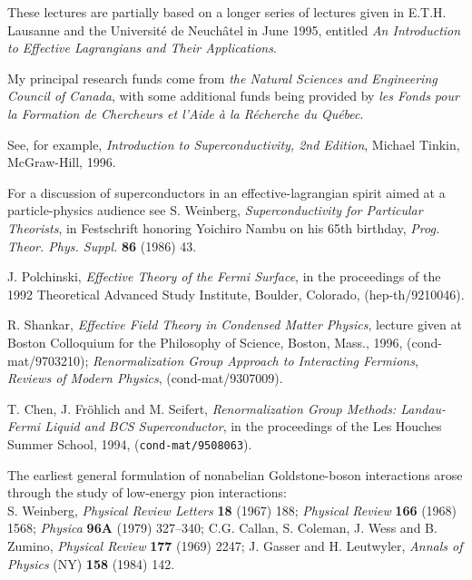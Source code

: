 \documentclass[12pt]{article}
\begin{document}
These lectures are partially based on a longer series of lectures
given in E.T.H. Lausanne and the Universit\'e de
Neuch\^atel in June 1995, entitled 
{\it An Introduction to Effective Lagrangians and Their Applications}. 

My principal research funds come from {\sl the Natural Sciences and 
Engineering Council of Canada}, with some additional funds 
being provided by {\sl les Fonds pour la Formation de Chercheurs 
et l'Aide \`a la R\'echerche du Qu\'ebec}. 

\begin{thebibliography}{99}
%
See, for example, {\it Introduction to Superconductivity, 
2nd Edition}, Michael Tinkin, McGraw-Hill, 1996.

For a discussion of superconductors in an effective-lagrangian
spirit aimed at a particle-physics audience 
see S. Weinberg, {\sl Superconductivity for Particular Theorists},
in Festschrift honoring Yoichiro Nambu on his 65th birthday,
{\it Prog. Theor. Phys. Suppl.} {\bf 86} (1986) 43.

J. Polchinski, {\sl  Effective Theory of the Fermi Surface}, 
in the proceedings of the 1992 Theoretical Advanced Study 
Institute, Boulder, Colorado, (hep-th/9210046).

R. Shankar, {\sl Effective Field Theory in Condensed Matter Physics},
lecture given at Boston Colloquium for the Philosophy of Science,
Boston, Mass., 1996, (cond-mat/9703210);
{\sl Renormalization Group Approach to Interacting Fermions},
{\it Reviews of Modern Physics}, (cond-mat/9307009).

T. Chen, J. Fr\"ohlich and M. Seifert, {\sl Renormalization
Group Methods: Landau-Fermi Liquid and BCS Superconductor},
in the proceedings of the Les Houches Summer School, 1994,
({\tt cond-mat/9508063}).

The earliest general formulation of nonabelian
Goldstone-boson interactions 
arose through the study of low-energy pion interactions:\\
S. Weinberg, {\it Physical Review Letters} {\bf 18} (1967) 188;
{\it Physical Review}  {\bf 166} (1968) 1568; 
{\it Physica} {\bf 96A} (1979) 327--340; 
C.G. Callan, S. Coleman, J. Wess and B. Zumino, {\it Physical Review}
{\bf 177} (1969) 2247;
J. Gasser and H. Leutwyler, 
{\it Annals of Physics} (NY) {\bf 158} (1984) 142.


\end{thebibliography}
\end{document}

